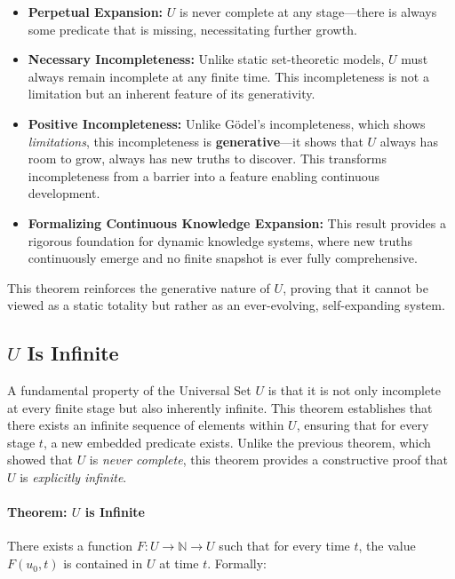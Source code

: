 \documentclass[12pt]{article}
\begin{document}
\begin{itemize}
    \item \textbf{Perpetual Expansion:} \( U \) is never complete at any stage—there is always some predicate that is missing, necessitating further growth.
    \item \textbf{Necessary Incompleteness:} Unlike static set-theoretic models, \( U \) must always remain incomplete at any finite time. This incompleteness is not a limitation but an inherent feature of its generativity.
    \item \textbf{Positive Incompleteness:} Unlike Gödel's incompleteness, which shows \textit{limitations}, this incompleteness is \textbf{generative}—it shows that \( U \) always has room to grow, always has new truths to discover. This transforms incompleteness from a barrier into a feature enabling continuous development.
    \item \textbf{Formalizing Continuous Knowledge Expansion:} This result provides a rigorous foundation for dynamic knowledge systems, where new truths continuously emerge and no finite snapshot is ever fully comprehensive.
\end{itemize}

This theorem reinforces the generative nature of \( U \), proving that it cannot be viewed as a static totality but rather as an ever-evolving, self-expanding system.


\subsection{\( U \) Is Infinite}

A fundamental property of the Universal Set \( U \) is that it is not only incomplete at every finite stage but also inherently infinite. This theorem establishes that there exists an infinite sequence of elements within \( U \), ensuring that for every stage \( t \), a new embedded predicate exists. Unlike the previous theorem, which showed that \( U \) is \textit{never complete}, this theorem provides a constructive proof that \( U \) is \textit{explicitly infinite}.

\paragraph{Theorem: \( U \) is Infinite}
There exists a function \( F: U \to \mathbb{N} \to U \) such that for every time \( t \), the value \( F(u_0, t) \) is contained in \( U \) at time \( t \). Formally:
\end{document}

